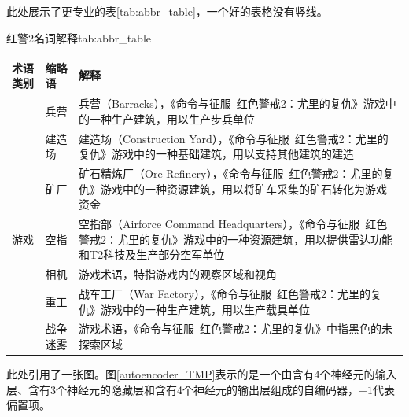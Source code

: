 \documentclass[a4paper,AutoFakeBold,oneside,12pt]{book}
\begin{document}
此处展示了更专业的表\ref{tab:abbr_table}，一个好的表格没有竖线。
\begin{bupttable}{红警2名词解释}{tab:abbr_table}
	\begin{tabularx}{\textwidth}{llX}
		\toprule
		\textbf{术语类别} & \textbf{缩略语} & \textbf{解释}                                                                                                                                  \\ \midrule
		                  & 兵营            & 兵营（Barracks），《命令与征服\ 红色警戒2：尤里的复仇》游戏中的一种生产建筑，用以生产步兵单位                                                  \\ \cmidrule(l){2-3}
		                  & 建造场          & 建造场（Construction Yard），《命令与征服\ 红色警戒2：尤里的复仇》游戏中的一种基础建筑，用以支持其他建筑的建造                                 \\ \cmidrule(l){2-3}
		                  & 矿厂            & 矿石精炼厂（Ore Refinery），《命令与征服\ 红色警戒2：尤里的复仇》游戏中的一种资源建筑，用以将矿车采集的矿石转化为游戏资金                      \\ \cmidrule(l){2-3}
		游戏              & 空指            & 空指部（Airforce Command Headquarters），《命令与征服\ 红色警戒2：尤里的复仇》游戏中的一种资源建筑，用以提供雷达功能和T2科技及生产部分空军单位 \\ \cmidrule(l){2-3}
		                  & 相机            & 游戏术语，特指游戏内的观察区域和视角                                                                                                           \\ \cmidrule(l){2-3}
		                  & 重工            & 战车工厂（War Factory），《命令与征服\ 红色警戒2：尤里的复仇》游戏中的一种生产建筑，用以生产载具单位                                           \\ \cmidrule(l){2-3}
		                  & 战争迷雾        & 游戏术语，《命令与征服\ 红色警戒2：尤里的复仇》中指黑色的未探索区域                                                                            \\ \bottomrule
	\end{tabularx}
\end{bupttable}

此处引用了一张图。图\ref{autoencoder_TMP}表示的是一个由含有4个神经元的输入层、含有3个神经元的隐藏层和含有4个神经元的输出层组成的自编码器，$+1$代表偏置项。
\end{document}
